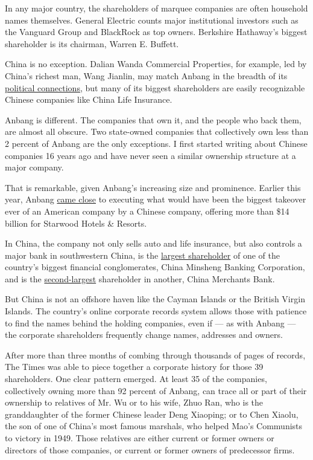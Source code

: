 In any major country, the shareholders of marquee companies are often
household names themselves. General Electric counts major institutional
investors such as the Vanguard Group and BlackRock as top owners.
Berkshire Hathaway's biggest shareholder is its chairman, Warren E.
Buffett.

China is no exception. Dalian Wanda Commercial Properties, for example,
led by China's richest man, Wang Jianlin, may match Anbang in the
breadth of its
\href{http://www.nytimes.com/2015/04/29/world/asia/wang-jianlin-abillionaire-at-the-intersection-of-business-and-power-in-china.html}{political
connections}, but many of its biggest shareholders are easily
recognizable Chinese companies like China Life Insurance.

Anbang is different. The companies that own it, and the people who back
them, are almost all obscure. Two state-owned companies that
collectively own less than 2 percent of Anbang are the only exceptions.
I first started writing about Chinese companies 16 years ago and have
never seen a similar ownership structure at a major company.

That is remarkable, given Anbang's increasing size and prominence.
Earlier this year, Anbang
\href{http://www.nytimes.com/2016/04/01/business/dealbook/starwood-hotels-chinese-suitor-backs-out-of-bidding.html}{came
close} to executing what would have been the biggest takeover ever of an
American company by a Chinese company, offering more than \$14 billion
for Starwood Hotels \& Resorts.

In China, the company not only sells auto and life insurance, but also
controls a major bank in southwestern China, is the
\href{http://dealbook.nytimes.com/2015/01/31/president-of-china-minsheng-bank-steps-down/?_r=0}{largest
shareholder} of one of the country's biggest financial conglomerates,
China Minsheng Banking Corporation, and is the
\href{http://www.hkexnews.hk/listedco/listconews/SEHK/2016/0428/LTN201604281519.pdf}{second-largest}
shareholder in another, China Merchants Bank.

But China is not an offshore haven like the Cayman Islands or the
British Virgin Islands. The country's online corporate records system
allows those with patience to find the names behind the holding
companies, even if --- as with Anbang --- the corporate shareholders
frequently change names, addresses and owners.

After more than three months of combing through thousands of pages of
records, The Times was able to piece together a corporate history for
those 39 shareholders. One clear pattern emerged. At least 35 of the
companies, collectively owning more than 92 percent of Anbang, can trace
all or part of their ownership to relatives of Mr. Wu or to his wife,
Zhuo Ran, who is the granddaughter of the former Chinese leader Deng
Xiaoping; or to Chen Xiaolu, the son of one of China's most famous
marshals, who helped Mao's Communists to victory in 1949. Those
relatives are either current or former owners or directors of those
companies, or current or former owners of predecessor firms.

